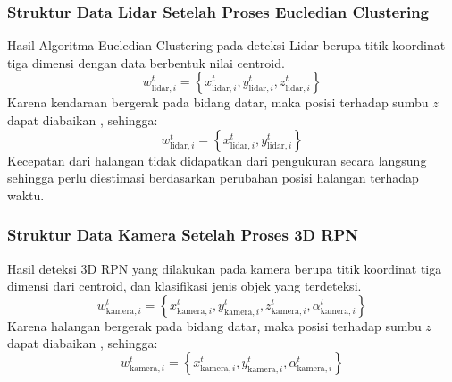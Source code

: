 \begin{frame}
    \frametitle{Struktur Data Lidar Setelah Proses Eucledian Clustering}

    Hasil Algoritma Eucledian Clustering pada deteksi Lidar berupa titik koordinat tiga dimensi dengan data berbentuk nilai centroid.
    \begin{equation}
        w_{\text{lidar},i}^{t}=\left\{x_{\text{lidar}, i}^{t}, y_{\text{lidar}, i}^{t}, z_{\text{lidar},i}^{t}\right\}
    \end{equation}
    Karena kendaraan bergerak pada bidang datar, maka posisi terhadap sumbu $z$ dapat diabaikan \cite{kim2020EKFradarlidar}, sehingga:
    \begin{equation}
        w_{\text{lidar},i}^{t}=\left\{x_{\text{lidar}, i}^{t}, y_{\text{lidar}, i}^{t}\right\}
    \end{equation}
    Kecepatan dari halangan tidak didapatkan dari pengukuran secara langsung sehingga perlu diestimasi berdasarkan perubahan posisi halangan terhadap waktu.
\end{frame}


\begin{frame}
    \frametitle{Struktur Data Kamera Setelah Proses 3D RPN}

    Hasil deteksi 3D RPN yang dilakukan pada kamera berupa titik koordinat tiga dimensi dari centroid, dan klasifikasi jenis objek yang terdeteksi.
    \begin{equation}
        w_{\text{kamera},i}^{t}=\left\{x_{\text{kamera}, i}^{t}, y_{\text{kamera}, i}^{t}, z_{\text{kamera},i}^{t}, \alpha_{\text{kamera},i}^{t}\right\}
    \end{equation}
    Karena halangan bergerak pada bidang datar, maka posisi terhadap sumbu $z$ dapat diabaikan \cite{kim2020EKFradarlidar}, sehingga:
    \begin{equation}
        w_{\text{kamera},i}^{t}=\left\{x_{\text{kamera}, i}^{t}, y_{\text{kamera}, i}^{t}, \alpha_{\text{kamera},i}^{t}\right\}
    \end{equation}
\end{frame}


